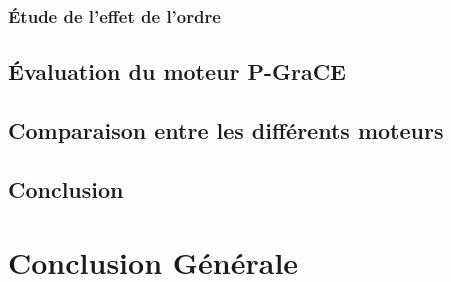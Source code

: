 \documentclass[a4paper,oneside,12pt]{report}
\theoremstyle{definition}
\begin{document}
			\subsection{Étude de l'effet de l'ordre}
			
	\section{Évaluation du moteur P-GraCE}
	
	\section{Comparaison entre les différents moteurs}
	
	\section{Conclusion}

\chapter{Conclusion Générale}








\pagestyle{plain}
\newpage
\end{document}
